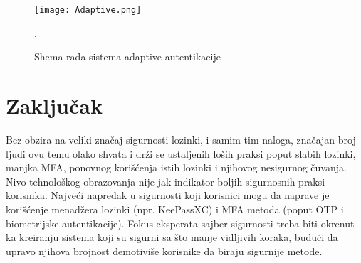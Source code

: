 \documentclass[fleqn, 12pt]{article}
\begin{document}
\begin{figure}[H]
    \centering
    \texttt{[image: Adaptive.png]}
    \caption{Shema rada sistema adaptive autentikacije\cite{adaptive}}.
    \label{fig:enter-label}
\end{figure}

\newpage
\section{Zaključak}
\indent Bez obzira na veliki značaj sigurnosti lozinki, i samim tim naloga, značajan broj ljudi ovu temu olako shvata i drži se ustaljenih loših praksi poput slabih lozinki, manjka MFA, ponovnog korišćenja istih lozinki i njihovog nesigurnog čuvanja. Nivo tehnološkog obrazovanja nije jak indikator boljih sigurnosnih praksi korisnika. Najveći napredak u sigurnosti koji korisnici mogu da naprave je korišćenje menadžera lozinki (npr. KeePassXC) i MFA metoda (poput OTP i biometrijske autentikacije). Fokus eksperata sajber sigurnosti treba biti okrenut ka kreiranju sistema koji su sigurni sa što manje vidljivih koraka, budući da upravo njihova brojnost demotiviše korisnike da biraju sigurnije metode. 

\end{document}

